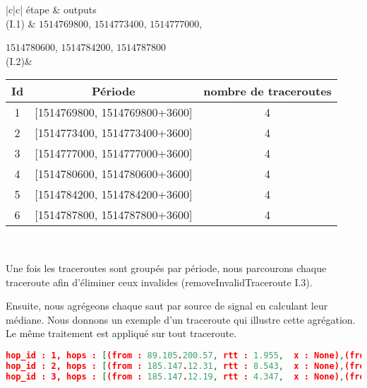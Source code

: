 
\begin{table}[H]
	\centering
	\begin{tabularx}{\linewidth}{|c|c|}
	étape &  outputs	\\ \hline
	(I.1) &   $ 1514769800 $, $ 1514773400 $, $ 1514777000 $,
	
	 $ 1514780600 $, $ 1514784200 $, $ 1514787800 $\\ \hline
(I.2)& 
				\begin{tabular}{ccc}
	Id&	Période& nombre de traceroutes \\ \hline
	1&	[1514769800, 1514769800+3600] & 4\\ \hline
	2&	[1514773400, 1514773400+3600] & 4\\ \hline
	3&	[1514777000, 1514777000+3600] & 4\\ \hline
	4&	[1514780600, 1514780600+3600] &4 \\ \hline
	5&	[1514784200, 1514784200+3600] &4 \\ \hline
	6&	[1514787800, 1514787800+3600] & 4 \\ \hline
				\end{tabular}\\ \hline
\end{tabularx}
\end{table}

Une fois les traceroutes sont groupés par période, nous parcourons chaque traceroute afin d'éliminer ceux invalides (removeInvalidTraceroute I.3). 

Ensuite, nous agrégeons chaque saut par source de signal en calculant leur médiane. Nous donnons un exemple d'un traceroute qui illustre cette agrégation. Le même traitement est appliqué sur tout traceroute. 

\begin{lstlisting}[language=json,firstnumber=1, caption={Les saut du traceroute T7 (sans agrégation)}]
hop_id : 1, hops : [(from : 89.105.200.57, rtt : 1.955,  x : None),(from : 89.105.200.57, rtt : 1.7, x : None),(from : 89.105.200.57, rtt : 1.709,  x : None)]
hop_id : 2, hops : [(from : 185.147.12.31, rtt : 8.543,  x : None),(from : 185.147.12.31, rtt : 4.103, x : None),(from : 185.147.12.31, rtt : 4.41, x : None)]
hop_id : 3, hops : [(from : 185.147.12.19, rtt : 4.347,  x : None),(from : 185.147.12.19, rtt : 2.876, x : None),(from : 185.147.12.19, rtt : 3.143, x : None )]
\end{lstlisting}

